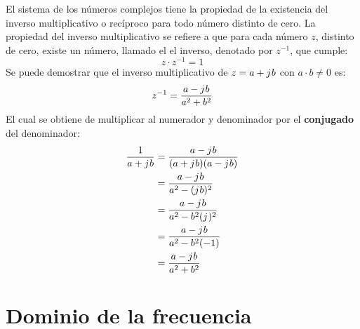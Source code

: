 \documentclass[
	12pt, %
	fleqn, %
	a4paper, %
]{LegrandOrangeBook}
\begin{document}
\begin{definition}
El sistema de los números complejos tiene la propiedad de la existencia del inverso multiplicativo o recíproco para todo número distinto de cero. La propiedad del inverso multiplicativo se refiere a que para cada número $z$, distinto de cero, existe un número, llamado el el inverso, denotado por $z^{-1}$, que cumple:
\begin{equation}
z\cdot z^{-1}=1
\end{equation}
Se puede demostrar que el inverso multiplicativo de $z=a+{j\mkern1mu} b$ con $a\cdot b\neq 0$ es:
\begin{equation}
z^{-1}=\frac{a-{j\mkern1mu} b}{a^2+b^2}
\end{equation}
El cual se obtiene de multiplicar al numerador y denominador por el \textbf{conjugado} del denominador:
\begin{align*}
\frac{1}{a+{j\mkern1mu} b}&=\frac{a-{j\mkern1mu} b}{(a+{j\mkern1mu} b)(a-{j\mkern1mu} b)}\\
&=\frac{a-{j\mkern1mu} b}{a^2-({j\mkern1mu} b)^2}\\
&=\frac{a-{j\mkern1mu} b}{a^2-b^2({j\mkern1mu})^2}\\
&=\frac{a-{j\mkern1mu} b}{a^2-b^2(-1)}\\
&=\frac{a-{j\mkern1mu} b}{a^2+b^2}
\end{align*}
\end{definition}
\chapter{Dominio de la frecuencia}
\end{document}
